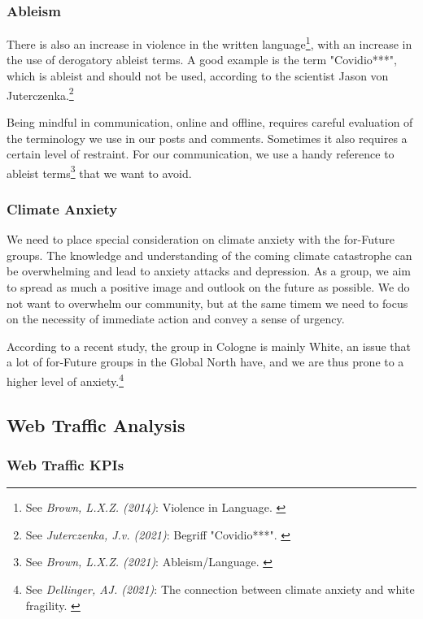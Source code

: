 \subsubsection{Ableism}

There is also an increase in violence in the written language\footnote{See \textit{Brown, L.X.Z. (2014)}: Violence in Language. \cite{violenceLanguage}}, with an increase in the use of derogatory ableist terms. A good example is the term "Covidio***", which is ableist and should not be used, according to the scientist Jason von Juterczenka.\footnote{See \textit{Juterczenka, J.v. (2021)}: Begriff "Covidio***". \cite{covidioXXX}}

Being mindful in communication, online and offline, requires careful evaluation of the terminology we use in our posts and comments. Sometimes it also requires a certain level of restraint. For our communication, we use a handy reference to ableist terms\footnote{See \textit{Brown, L.X.Z. (2021)}: Ableism/Language. \cite{ableismLanguage}} that we want to avoid.

\subsubsection{Climate Anxiety}

We need to place special consideration on climate anxiety with the for-Future groups. The knowledge and understanding of the coming climate catastrophe can be overwhelming and lead to anxiety attacks and depression. As a group, we aim to spread as much a positive image and outlook on the future as possible. We do not want to overwhelm our community, but at the same timem we need to focus on the necessity of immediate action and convey a sense of urgency.

According to a recent study, the group in Cologne is mainly White, an issue that a lot of for-Future groups in the Global North have, and we are thus prone to a higher level of anxiety.\footnote{See \textit{Dellinger, AJ. (2021)}: The connection between climate anxiety and white fragility. \cite{climateAnxiety}}

\subsection{Web Traffic Analysis}

\subsubsection{Web Traffic KPIs}

